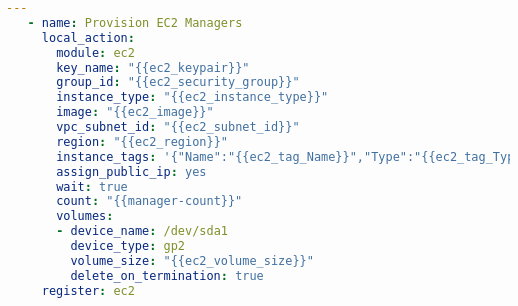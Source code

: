 \begin{lstlisting}[float,floatplacement=h,language=yaml,caption={provision-ec2-managers.yml},label={lst:provisionRole},basicstyle=\small]
  ---
   - name: Provision EC2 Managers
     local_action:
       module: ec2
       key_name: "{{ec2_keypair}}"
       group_id: "{{ec2_security_group}}"
       instance_type: "{{ec2_instance_type}}"
       image: "{{ec2_image}}"
       vpc_subnet_id: "{{ec2_subnet_id}}"
       region: "{{ec2_region}}"
       instance_tags: '{"Name":"{{ec2_tag_Name}}","Type":"{{ec2_tag_Type}}","Environment":"{{ec2_tag_Environment}}"}'
       assign_public_ip: yes
       wait: true
       count: "{{manager-count}}"
       volumes: 
       - device_name: /dev/sda1
         device_type: gp2
         volume_size: "{{ec2_volume_size}}"
         delete_on_termination: true
     register: ec2
\end{lstlisting}
